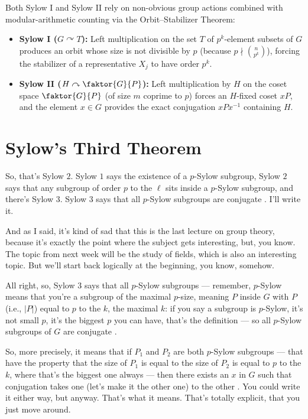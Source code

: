 \begin{insight}
Both Sylow I and Sylow II rely on non-obvious group actions combined with modular-arithmetic counting via the Orbit--Stabilizer Theorem:
\begin{itemize}
    \item \textbf{Sylow I ($G \curvearrowright T$):} Left multiplication on the set $T$ of $p^k$-element subsets of $G$ produces an orbit whose size is not divisible by $p$ (because $p \nmid \binom{n}{p^k}$), forcing the stabilizer of a representative $X_j$ to have order $p^k$.
    \item \textbf{Sylow II ($H \curvearrowright \faktor{G}{P}$):} Left multiplication by $H$ on the coset space $\faktor{G}{P}$ (of size $m$ coprime to $p$) forces an $H$-fixed coset $x P$, and the element $x \in G$ provides the exact conjugation $x P x^{-1}$ containing $H$.
\end{itemize}
\end{insight}

\section{Sylow's Third Theorem}

\begin{speech}[00:34:35 - 00:36:42]
So, that's Sylow $2$. Sylow $1$ says the existence of a $p$-Sylow subgroup, Sylow $2$ says that any subgroup of order $p$ to the $\ell$ sits inside a $p$-Sylow subgroup, and there's Sylow $3$. Sylow $3$ says that all $p$-Sylow subgroups are conjugate . I'll write it.

And as I said, it's kind of sad that this is the last lecture on group theory, because it's exactly the point where the subject gets interesting, but, you know. The topic from next week will be the study of fields, which is also an interesting topic. But we'll start back logically at the beginning, you know, somehow.

All right, so, Sylow $3$ says that all $p$-Sylow subgroups --- remember, $p$-Sylow means that you're a subgroup of the maximal $p$-size, meaning $P$ inside $G$ with $P$ (i.e., $|P|$) equal to $p$ to the $k$, the maximal $k$: if you say a subgroup is $p$-Sylow, it's not small $p$, it's the biggest $p$ you can have, that's the definition --- so all $p$-Sylow subgroups of $G$ are conjugate .

So, more precisely, it means that if $P_1$ and $P_2$ are both $p$-Sylow subgroups --- that have the property that the size of $P_1$ is equal to the size of $P_2$ is equal to $p$ to the $k$, where that's the biggest one always --- then there exists an $x$ in $G$ such that conjugation takes one (let's make it the other one) to the other . You could write it either way, but anyway. That's what it means. That's totally explicit, that you just move around.
\end{speech}

